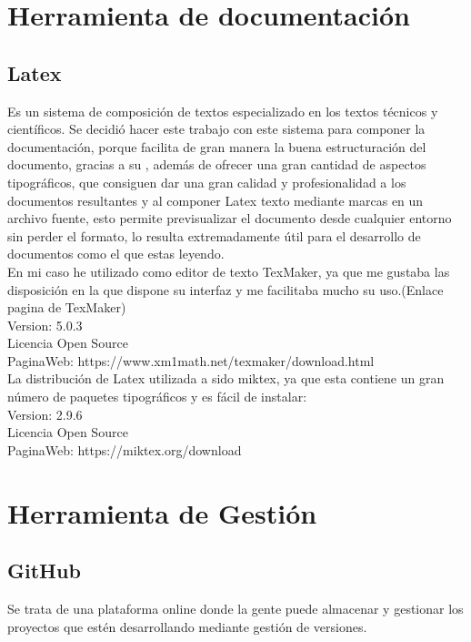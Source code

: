 \section{Herramienta de documentación}

\subsection{Latex}

Es un sistema de composición de textos especializado en los textos técnicos y científicos.
Se decidió hacer este trabajo con este sistema para componer la documentación, porque facilita de gran manera la buena estructuración del documento, gracias a su , además de ofrecer una gran cantidad de aspectos tipográficos, que consiguen dar una gran calidad y profesionalidad a los documentos resultantes y al componer Latex texto mediante marcas en un archivo fuente, esto permite previsualizar el documento desde cualquier entorno sin perder el formato, lo resulta extremadamente útil para el desarrollo de documentos como el que estas leyendo.\\

En mi caso he utilizado como editor de texto TexMaker, ya que me gustaba las disposición en la que dispone su interfaz y me facilitaba mucho su uso.(Enlace pagina de TexMaker)\\
Version: 5.0.3\\
Licencia Open Source\\
PaginaWeb: https://www.xm1math.net/texmaker/download.html\\

La distribución de Latex utilizada a sido miktex, ya que esta contiene un gran número de paquetes tipográficos y es fácil de instalar:\\
Version: 2.9.6\\
Licencia Open Source\\
PaginaWeb: https://miktex.org/download\\


\section{Herramienta de Gestión}

\subsection{GitHub}

Se trata de una plataforma online donde la gente puede almacenar y gestionar los proyectos que estén desarrollando mediante gestión de versiones.\\

